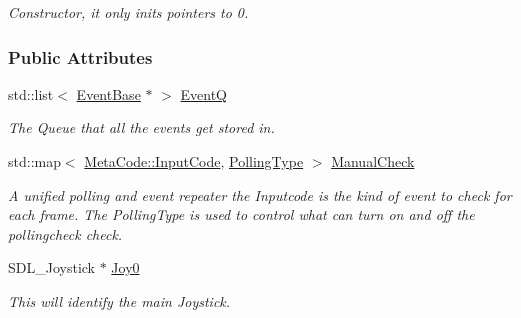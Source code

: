 \begin{DoxyCompactItemize}
\begin{DoxyCompactList}\small\item\em Constructor, it only inits pointers to 0. \item\end{DoxyCompactList}\end{DoxyCompactItemize}
\subsubsection*{Public Attributes}
\begin{DoxyCompactItemize}
\item 
\hypertarget{structphys_1_1internal_1_1EventManagerInternalData_a2a3389f3831cae8ded6dd0a3b6395a68}{
std::list$<$ \hyperlink{classphys_1_1EventBase}{EventBase} $\ast$ $>$ \hyperlink{structphys_1_1internal_1_1EventManagerInternalData_a2a3389f3831cae8ded6dd0a3b6395a68}{EventQ}}
\label{structphys_1_1internal_1_1EventManagerInternalData_a2a3389f3831cae8ded6dd0a3b6395a68}

\begin{DoxyCompactList}\small\item\em The Queue that all the events get stored in. \item\end{DoxyCompactList}\item 
\hypertarget{structphys_1_1internal_1_1EventManagerInternalData_a717396b1782d7f491e0f085643507639}{
std::map$<$ \hyperlink{classphys_1_1MetaCode_a3e501cbb5bf0f6f1fdb7211465bda8d8}{MetaCode::InputCode}, \hyperlink{structphys_1_1internal_1_1EventManagerInternalData_ab9ab8380b84448aacf46a63050e159af}{PollingType} $>$ \hyperlink{structphys_1_1internal_1_1EventManagerInternalData_a717396b1782d7f491e0f085643507639}{ManualCheck}}
\label{structphys_1_1internal_1_1EventManagerInternalData_a717396b1782d7f491e0f085643507639}

\begin{DoxyCompactList}\small\item\em A unified polling and event repeater the Inputcode is the kind of event to check for each frame. The PollingType is used to control what can turn on and off the pollingcheck check. \item\end{DoxyCompactList}\item 
\hypertarget{structphys_1_1internal_1_1EventManagerInternalData_aafd32b9b23cb2121bd268e3c56a3f46e}{
SDL\_\-Joystick $\ast$ \hyperlink{structphys_1_1internal_1_1EventManagerInternalData_aafd32b9b23cb2121bd268e3c56a3f46e}{Joy0}}
\label{structphys_1_1internal_1_1EventManagerInternalData_aafd32b9b23cb2121bd268e3c56a3f46e}

\begin{DoxyCompactList}\small\item\em This will identify the main Joystick. \item\end{DoxyCompactList}\end{DoxyCompactItemize}


